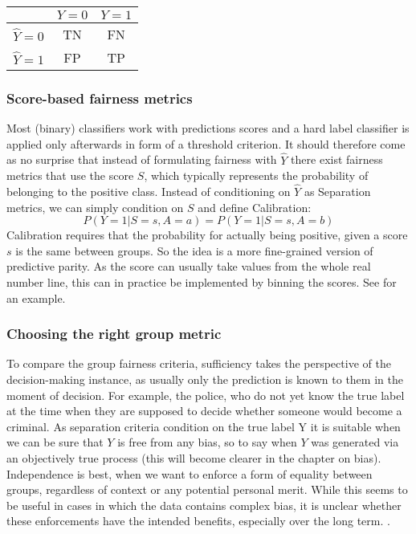 \begin{center}
    \renewcommand{\arraystretch}{1.5}  %
    \begin{tabular}{c|c|c|}
        \hline
        & \(Y = 0\) & \(Y = 1\) \\
        \hline
        \(\hat{Y} = 0\) & TN & FN \\
        \hline
        \(\hat{Y} = 1\) & FP & TP \\
    \end{tabular}
    \label{tab:confusion_matrix}
\end{center}

\subsubsection*{Score-based fairness metrics}
Most (binary) classifiers work with predictions scores and a hard label classifier is applied only afterwards in form of a threshold criterion. It should therefore come as no surprise that instead of formulating fairness with $\hat{Y}$ there exist fairness metrics that use the score $S$, which typically represents the probability of belonging to the positive class. Instead of conditioning on $\hat{Y}$ as Separation metrics, we can simply condition on $S$ and define Calibration:
$$P(Y = 1 | S = s, A = a) = P(Y = 1 | S = s, A = b)$$
Calibration requires that the probability for actually being positive, given a score $s$ is the same between groups. So the idea is a more fine-grained version of predictive parity. As the score can usually take values from the whole real number line, this can in practice be implemented by binning the scores. See \cite{verma2018} for an example.\\



\subsubsection*{Choosing the right group metric}
To compare the group fairness criteria, sufficiency takes the perspective of the decision-making instance, as usually only the prediction is known to them in the moment of decision. For example, the police, who do not yet know the true label at the time when they are supposed to decide whether someone would become a criminal.
As separation criteria condition on the true label Y it is suitable when we can be sure that $Y$ is free from any bias, so to say when $Y$ was generated via an objectively true process (this will become clearer in the chapter on bias).
Independence is best, when we want to enforce a form of equality between groups, regardless of context or any potential personal merit. While this seems to be useful in cases in which the data contains complex bias, it is unclear whether these enforcements have the intended benefits, especially over the long term. {\color{red}{Reference?}}. \\


